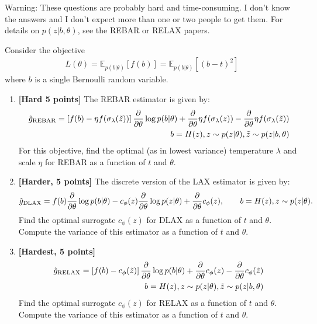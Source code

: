 \documentclass{harvardml}
\newcommand{\E}{\mathbb{E}}
\newcommand{\PT}{\frac{\partial}{\partial \theta}}
\newcommand{\LAX}{{\textnormal{LAX}}}
\newcommand{\DLAX}{{\textnormal{DLAX}}}
\theoremstyle{plain}
\begin{document}
\begin{problem}

Warning: These questions are probably hard and time-consuming.  I don't know the answers and I don't expect more than one or two people to get them. For details on $p(z|b, \theta)$, see the REBAR or RELAX papers.

Consider the objective
%
\begin{align}
L(\theta) 
= \E_{p(b|\theta)} \left[ f(b) \right]
= \E_{p(b|\theta)} \left[ (b - t)^2 \right]
\end{align}
%
where $b$ is a single Bernoulli random variable.


\begin{enumerate}[label=(\alph*)]
\item {\bf [Hard 5 points]} The REBAR estimator is given by:
\begin{align}
\hat g_\textnormal{REBAR} = \left[ f(b) - \eta f(\sigma_\lambda(\tilde{z})) \right] \PT \log p(b|\theta) + \PT \eta f(\sigma_\lambda(z)) - \PT \eta f(\sigma_\lambda(\tilde{z})) \\
\qquad b = H(z), z \sim p(z|\theta), \tilde{z} \sim p(z|b, \theta) \nonumber
\end{align}
%
For this objective, find the optimal (as in lowest variance) temperature $\lambda$ and scale $\eta$ for REBAR as a function of $t$ and $\theta$.
\item {\bf [Harder, 5 points]} The discrete version of the \LAX{} estimator is given by:
%
\begin{align}
\label{eq:discrete lax}
\hat g_\DLAX = f(b) \PT \log p(b|\theta) - c_\phi(z) \PT \log p(z|\theta) + \PT c_\phi(z), \qquad b = H(z), z \sim p(z|\theta).
\end{align}
%
Find the optimal surrogate $c_\phi(z)$ for DLAX as a function of $t$ and $\theta$.
Compute the variance of this estimator as a function of $t$ and $\theta$.
\item {\bf [Hardest, 5 points]} %
\begin{align}
\hat g_\textnormal{RELAX} = \left[ f(b) - c_\phi(\tilde{z}) \right] \PT \log p(b|\theta) + \PT c_\phi(z) - \PT c_\phi (\tilde{z}) \\
\qquad b = H(z), z \sim p(z|\theta), \tilde{z} \sim p(z|b, \theta) \nonumber
\end{align}
%
Find the optimal surrogate $c_\phi(z)$ for RELAX as a function of $t$ and $\theta$.
Compute the variance of this estimator as a function of $t$ and $\theta$.
\end{enumerate}
\end{problem}



\end{document}
